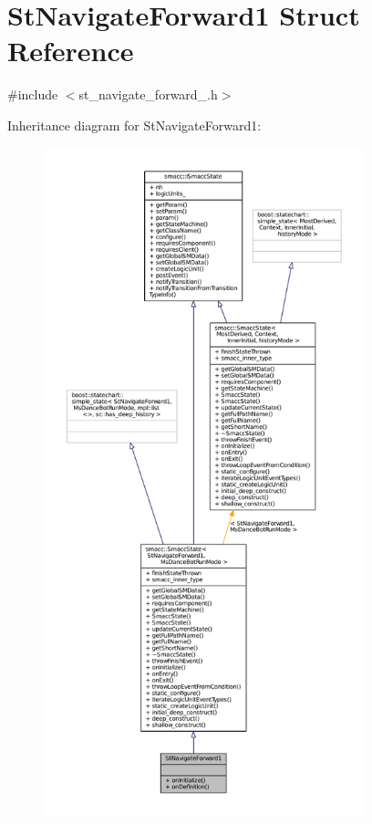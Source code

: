 \hypertarget{structStNavigateForward1}{}\section{St\+Navigate\+Forward1 Struct Reference}
\label{structStNavigateForward1}


{\ttfamily \#include $<$st\+\_\+navigate\+\_\+forward\+\_.\+h$>$}



Inheritance diagram for St\+Navigate\+Forward1\+:
\nopagebreak
\begin{figure}[H]
\begin{center}
\leavevmode
\includegraphics[height=550pt]{structStNavigateForward1__inherit__graph}
\end{center}
\end{figure}



